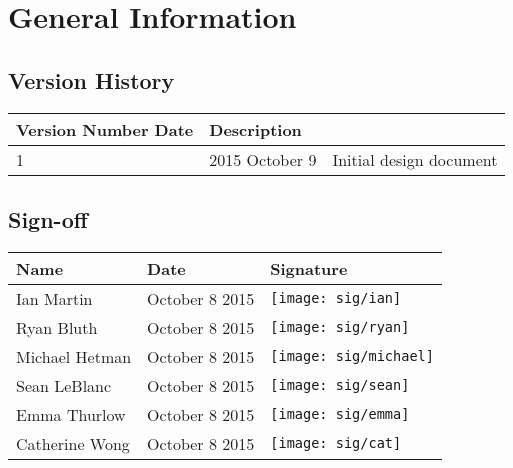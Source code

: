 \chapter{General Information}

\section{Version History}
\begin{tabular}{| p{} | p{} | p{} |}
  \hline
  Version Number 
  Date & Description\\
  \hline
  1 & 2015 October 9 & Initial design document\\
  \hline
\end{tabular}


\section{Sign-off}
\begin{tabular}{| p{} | p{} | p{} |}
  \hline
  Name & Date & Signature \\
  \hline
  Ian Martin & October 8 2015 & \texttt{[image: sig/ian]}\\
  \hline
  Ryan Bluth & October 8 2015 & \texttt{[image: sig/ryan]}\\
  \hline
  Michael Hetman & October 8 2015 & \texttt{[image: sig/michael]}\\
  \hline
  Sean LeBlanc & October 8 2015 & \texttt{[image: sig/sean]}\\
  \hline
  Emma Thurlow & October 8 2015 & \texttt{[image: sig/emma]}\\
  \hline
  Catherine Wong & October 8 2015 & \texttt{[image: sig/cat]}\\
  \hline
\end{tabular}
\setcounter{secnumdepth}{3}

\renewcommand*\contentsname{Table of Contents}

\tableofcontents
\listoffigures
